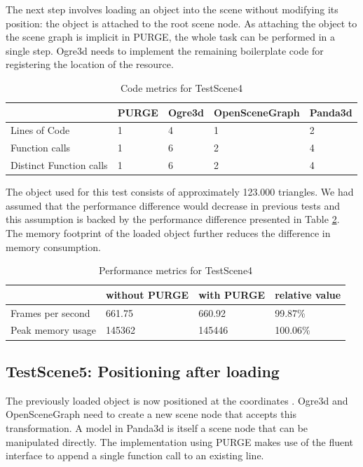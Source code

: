 	The next step involves loading an object into the scene without modifying its position: the object is attached to the root scene node. As attaching the object to the scene graph is implicit in PURGE, the whole task can be performed in a single step. Ogre3d needs to implement the remaining boilerplate code for registering the location of the resource.

	\begin{table}[htpb]
		\center
		\caption{Code metrics for TestScene4}
		\begin{tabular}{l | l | l | l | l}
			& PURGE & Ogre3d & OpenSceneGraph & Panda3d\\ \hline
			Lines of Code & 1 & 4 & 1 & 2\\
			Function calls & 1 & 6 & 2 & 4\\
			Distinct Function calls & 1 & 6 & 2 & 4\\
		\end{tabular}
		\label{tbl:Code4}
	\end{table}

	The object used for this test consists of approximately 123.000 triangles. We had assumed that the performance difference would decrease in previous tests and this assumption is backed by the performance difference presented in Table \ref{tbl:Performance4}. The memory footprint of the loaded object further reduces the difference in memory consumption.

	\begin{table}[htpb]
		\center
		\caption{Performance metrics for TestScene4}
		\begin{tabular}{l | l | l | l}
			& without PURGE & with PURGE & relative value\\ \hline
			Frames per second & 661.75 & 660.92 & 99.87\%\\
			Peak memory usage & 145362 & 145446 & 100.06\%\\
		\end{tabular}
		\label{tbl:Performance4}
	\end{table}

\subsection{TestScene5: Positioning after loading}

	The previously loaded object is now positioned at the coordinates . Ogre3d and OpenSceneGraph need to create a new scene node that accepts this transformation. A model in Panda3d is itself a scene node that can be manipulated directly. The implementation using PURGE makes use of the fluent interface to append a single function call to an existing line.

